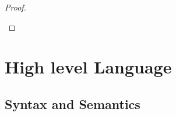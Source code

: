 \documentclass[a4paper,11pt]{article}
\begin{document}
\begin{proof}
\begin{itemize}
\end{itemize}
\end{proof}
%
%
%
%
\section{High level Language}
%
\subsection{Syntax and Semantics}
%
\end{document}
